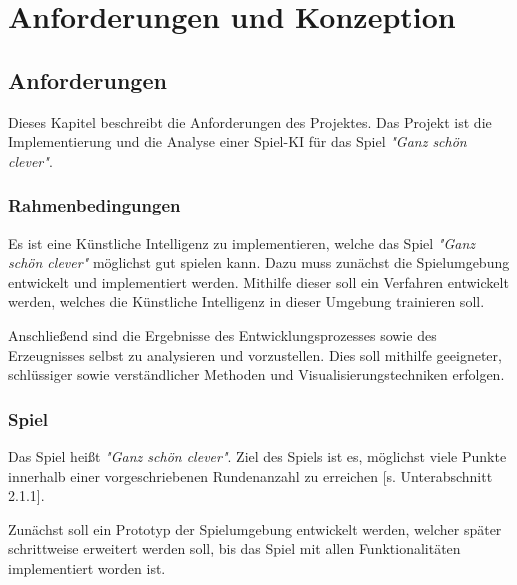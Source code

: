 \section{Anforderungen und Konzeption}
\subsection{Anforderungen}
Dieses Kapitel beschreibt die Anforderungen des Projektes. Das Projekt ist die Implementierung und die Analyse einer Spiel-KI für das Spiel \textit{"Ganz schön clever"}.
\subsubsection{Rahmenbedingungen}
Es ist eine Künstliche Intelligenz zu implementieren, welche das Spiel \textit{"Ganz schön clever"} möglichst gut spielen kann. Dazu muss zunächst die Spielumgebung entwickelt und implementiert werden. Mithilfe dieser soll ein Verfahren entwickelt werden, welches die Künstliche Intelligenz in dieser Umgebung trainieren soll.

Anschließend sind die Ergebnisse des Entwicklungsprozesses sowie des Erzeugnisses selbst zu analysieren und vorzustellen. Dies soll mithilfe geeigneter, schlüssiger sowie verständlicher Methoden und Visualisierungstechniken erfolgen.
\subsubsection{Spiel}
Das Spiel heißt \textit{"Ganz schön clever"}. Ziel des Spiels ist es, möglichst viele Punkte innerhalb einer vorgeschriebenen Rundenanzahl zu erreichen [s. Unterabschnitt 2.1.1].

Zunächst soll ein Prototyp der Spielumgebung entwickelt werden, welcher später schrittweise erweitert werden soll, bis das Spiel mit allen Funktionalitäten implementiert worden ist.\\

